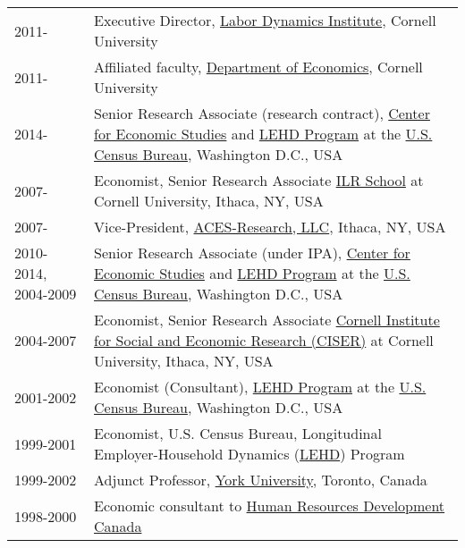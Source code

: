\documentclass[12pt,letterpaper]{report}
\begin{document}
\begin{tabular}{p{1in}p{4in}}
2011-    &Executive Director, \href{http://www.ilr.cornell.edu/ldi}{Labor Dynamics Institute}, 
Cornell University\\ %
2011-    &Affiliated faculty, \href{http://economics.cornell.edu}{Department of Economics}, 
Cornell University\\ %
2014-    &Senior Research Associate (research contract),
\href{http://www.ces.census.gov}{Center for Economic Studies} and \href{http://lehd.did.census.gov}{LEHD Program} at the
\href{http://www.census.gov}{U.S. Census Bureau}, Washington D.C., USA 
\\ %
2007-    & Economist, Senior Research Associate 
\href{http://www.ilr.cornell.edu}{ILR School} at Cornell University, Ithaca,
NY, USA 
\\%
2007-    & Vice-President,
\href{http://www.aces-research.com}{ACES-Research, LLC}, Ithaca,
NY, USA\\%
2010-2014, 2004-2009  &Senior Research Associate (under IPA),
\href{http://www.ces.census.gov}{Center for Economic Studies} and 
\href{http://lehd.ces.census.gov}{LEHD Program} at the
\href{http://www.census.gov}{U.S. Census Bureau}, Washington D.C., USA 
\\ %
2004-2007    & Economist, Senior Research Associate 
\href{http://www.ciser.cornell.edu}{Cornell Institute for Social and Economic
	Research (CISER)} at Cornell University, Ithaca,
NY, USA 
\\%
2001-2002    &Economist (Consultant), \href{http://lehd.ces.census.gov}{LEHD Program} at the
\href{http://www.census.gov}{U.S. Census Bureau}, Washington D.C., USA 
\\%
1999-2001    &Economist, U.S. Census Bureau, Longitudinal
Employer-Household Dynamics (\href{http://lehd.did.census.gov}{LEHD}) Program 
\\%
1999-2002    &Adjunct Professor, \href{http://econ.yorku.ca}{York University}, Toronto, Canada\\
1998-2000    &Economic consultant to
\href{http://www.hrdc-drhc.gc.ca/}{Human Resources Development Canada}
\\%
\end{tabular}
\end{document}
